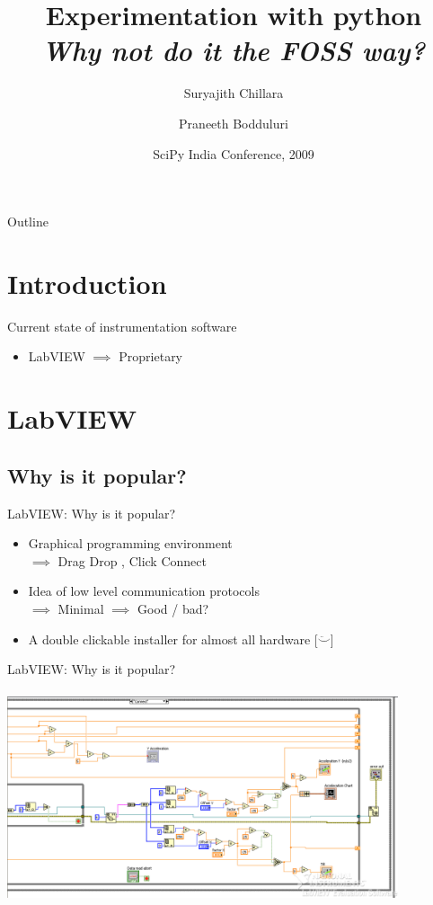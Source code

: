 \documentclass{beamer}
\title[Experimentation with python - why not do it the FOSS way?] 
{%
  \textbf{Experimentation with python} \\ \textit{Why not do it the FOSS way?}%
}
\author[Suryajith, Praneeth]
{
  Suryajith Chillara\inst{1} \and
  Praneeth Bodduluri\inst{1}
}
\institute[IIT Kanpur]
{
  \inst{1}%
  Indian Institute of Technology, Kanpur
}
\date[SciPy.in 2009]
{SciPy India Conference, 2009}
\begin{document}
\begin{frame}
  \titlepage
\end{frame}

\begin{frame}{Outline}
  \tableofcontents
\end{frame}


\section{Introduction}


\begin{frame}[fragile]{Current state of instrumentation software} 
\begin{block}{}
\begin{itemize}
 \item LabVIEW $\implies$ Proprietary
\end{itemize}
\end{block}
\end{frame}

\section{LabVIEW}

\subsection{Why is it popular? }
\begin{frame}{LabVIEW: Why is it popular?}
\begin{block}{}
\begin{itemize}
 \item Graphical programming environment \\$\implies$ Drag Drop , Click Connect
 \item Idea of low level communication protocols \\$\implies$ Minimal $\implies$ Good / bad?
 \item A double clickable installer for almost all hardware [$\ddot\smile$]
\end{itemize}
\end{block}
\end{frame}
\begin{frame}{LabVIEW: Why is it popular?}
   \includegraphics[width=115mm,height=70mm]{labview.png}
\end{frame}
\end{document}

